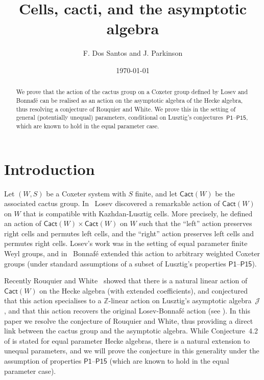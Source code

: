 \documentclass[11pt]{article}
\title{Cells, cacti, and the asymptotic algebra}
\author{F. Dos Santos and J. Parkinson}
\date{\today}
\theoremstyle{plain}
\theoremstyle{definition}
\numberwithin{equation}{section}
\def\cact{\mathsf{Cact}}
\def\cJ{\mathcal{J}}
\def\ZZ{\mathbb{Z}}
\begin{document}

\maketitle

\vspace{-0.5cm}

\begin{abstract}
We prove that the action of the cactus group on a Coxeter group defined by Losev and Bonnaf\'e can be realised as an action on the asymptotic algebra of the Hecke algebra, thus resolving a conjecture of Rouquier and White. We prove this in the setting of general (potentially unequal) parameters, conditional on Lusztig's conjectures~$\mathsf{P1}$--$\mathsf{P15}$, which are known to hold in the equal parameter case. 
\end{abstract}
%





\section{Introduction}


Let $(W,S)$ be a Coxeter system with $S$ finite, and let $\cact(W)$ be the associated cactus group. In~\cite{Los:19} Losev discovered a remarkable action of $\cact(W)$ on $W$ that is compatible with Kazhdan-Lusztig cells. More precisely, he defined an action of $\cact(W)\times\cact(W)$ on $W$ such that the ``left'' action preserves right cells and permutes left cells, and the ``right'' action preserves left cells and permutes right cells. Losev's work was in the setting of equal parameter finite Weyl groups, and in~\cite{Bon:16} Bonnaf\'e extended this action to arbitrary weighted Coxeter groups (under standard assumptions of a subset of Lusztig's properties $\mathsf{P1}$--$\mathsf{P15}$). 

Recently Rouquier and White~\cite{RW:24} showed that there is a natural linear action of $\cact(W)$ on the Hecke algebra (with extended coefficients), and conjectured that this action specialises to a $\ZZ$-linear action on Lusztig's asymptotic algebra~$\cJ$, and that this action recovers the original Losev-Bonnaf\'e action (see \cite[Conjecture~4.2]{RW:24}). In this paper we resolve the conjecture of Rouquier and White, thus providing a direct link between the cactus group and the asymptotic algebra. While Conjecture~4.2 of \cite{RW:24} is stated for equal parameter Hecke algebras, there is a natural extension to unequal parameters, and we will prove the conjecture in this generality under the assumption of properties $\mathsf{P1}$--$\mathsf{P15}$ (which are known to hold in the equal parameter case). 
\end{document}
